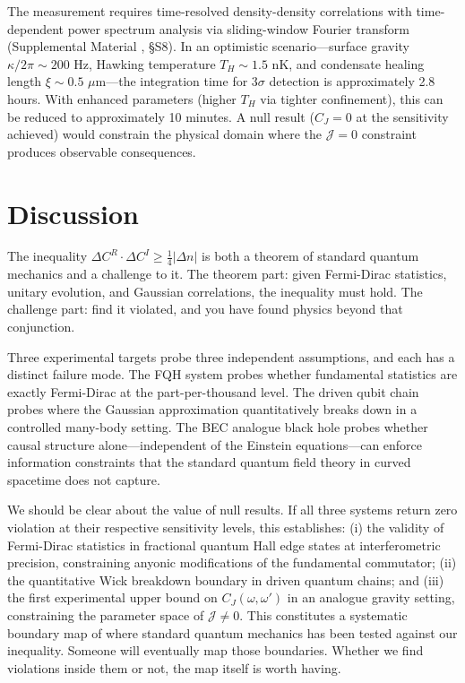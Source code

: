 \documentclass[aps,prd,reprint,superscriptaddress,twocolumn]{revtex4-2}
\begin{document}
The measurement requires time-resolved density-density correlations with time-dependent power spectrum analysis via sliding-window Fourier transform (Supplemental Material \cite{SM}, \S S8). In an optimistic scenario---surface gravity $\kappa/2\pi \sim 200$ Hz, Hawking temperature $T_H \sim 1.5$ nK, and condensate healing length $\xi \sim 0.5$ $\mu$m---the integration time for $3\sigma$ detection is approximately 2.8 hours. With enhanced parameters (higher $T_H$ via tighter confinement), this can be reduced to approximately 10 minutes. A null result ($C_J = 0$ at the sensitivity achieved) would constrain the physical domain where the $\mathcal{J}=0$ constraint produces observable consequences.

\section{Discussion}

The inequality $\Delta C^R \cdot \Delta C^I \geq \frac{1}{4}|\Delta n|$ is both a theorem of standard quantum mechanics and a challenge to it. The theorem part: given Fermi-Dirac statistics, unitary evolution, and Gaussian correlations, the inequality must hold. The challenge part: find it violated, and you have found physics beyond that conjunction.

Three experimental targets probe three independent assumptions, and each has a distinct failure mode. The FQH system probes whether fundamental statistics are exactly Fermi-Dirac at the part-per-thousand level. The driven qubit chain probes where the Gaussian approximation quantitatively breaks down in a controlled many-body setting. The BEC analogue black hole probes whether causal structure alone---independent of the Einstein equations---can enforce information constraints that the standard quantum field theory in curved spacetime does not capture.

We should be clear about the value of null results. If all three systems return zero violation at their respective sensitivity levels, this establishes: (i) the validity of Fermi-Dirac statistics in fractional quantum Hall edge states at interferometric precision, constraining anyonic modifications of the fundamental commutator; (ii) the quantitative Wick breakdown boundary in driven quantum chains; and (iii) the first experimental upper bound on $C_J(\omega,\omega')$ in an analogue gravity setting, constraining the parameter space of $\mathcal{J} \neq 0$. This constitutes a systematic boundary map of where standard quantum mechanics has been tested against our inequality. Someone will eventually map those boundaries. Whether we find violations inside them or not, the map itself is worth having.
\end{document}
